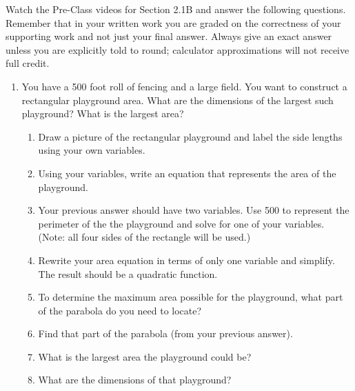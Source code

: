 


\noindent Watch the Pre-Class videos for Section 2.1B and answer the following questions. Remember that in your written work you are graded on the correctness of your supporting work and not just your final answer. Always give an exact answer unless you are explicitly told to round; calculator approximations will not receive full credit. 


\begin{enumerate}

\item   You have a 500 foot roll of fencing and a large field.  You want to construct a rectangular playground area.  What are the dimensions of the largest such playground?  What is the largest area?
\begin{enumerate}
\item Draw a picture of the rectangular playground and label the side lengths using your own variables.
\vfill
\vfill
\item Using your variables, write an equation that represents the area of the playground.
\vfill
\item Your previous answer should have two variables.  Use 500 to represent the perimeter of the the playground and solve for one of your variables.  (Note: all four sides of the rectangle will be used.)
\vfill
\vfill
\item Rewrite your area equation in terms of only one variable and simplify.  The result should be a quadratic function.
\vfill


\newpage



\item To determine the maximum area possible for the playground, what part of the parabola do you need to locate?
\vfill

\item Find that part of the parabola (from your previous answer).
\vfill
\vfill
\item What is the largest area the playground could be?
\vfill

\item  What are the dimensions of that playground?
\vfill

\end{enumerate}







\end{enumerate}



